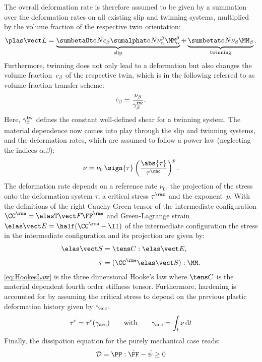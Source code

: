 The overall deformation rate is therefore assumed to be given by a summation over the deformation rates on all existing slip and twinning systems, multiplied by the volume fraction of the respective twin orientation\supercite{kalidindi1998incorporation}:  
\begin{equation}
  \LLp = \underbrace{\sumbO \cb \sumaI \nuab \MMab}_{\text{slip}} + \underbrace{\sumbI \nub \MMb}_{\text{twinning}}.
\end{equation}
Furthermore, twinning does not only lead to a deformation but also changes the volume fraction~$c_{\beta}$ of the respective twin, which is in the following referred to as volume fraction transfer scheme:
\begin{align}
  \dot{c}_{\beta} = \frac{\nu_\beta}{\gamma^{\rm tw}_\beta}.
\end{align}
Here, $\gamma^{\rm tw}_\beta$ defines the constant well-defined shear for a twinning system. The material dependence now comes into play through the slip and twinning systems, and the deformation rates, which are assumed to follow a power law (neglecting the indices $\alpha$,$\beta$):
\begin{align}
  \nu = \nu_0 \, \sign{\tau} \left( \frac{\abs{\tau}}{\tau^\rmc} \right)^{p}.
  \label{eq:powerlaw}
\end{align}
The deformation rate depends on a reference rate $\nu_0$, the projection of the stress onto the deformation system $\tau$, a critical stress $\tau^\rmc$ and the exponent~$p$. With the definitions of the right Cauchy-Green tensor of the intermediate configuration $\CCe=\FFeT\FFe$ and Green-Lagrange strain $\EEe=\half(\CCe-\II)$ of the intermediate configuration the stress in the intermediate configuration and its projection are given by:
\begin{align}
  \SSe &= \CCCC:\EEe,  \label{eq:HookesLaw} \\[3pt]
  \tau &= (\CCe\SSe):\MM.
\end{align}
\cref{eq:HookesLaw} is the three dimensional Hooke's law where $\CCCC$ is the material dependent fourth order stiffness tensor. Furthermore, hardening is accounted for by assuming the critical stress to depend on the previous plastic deformation history given by $\gamma_{\rm acc}$.
\begin{align}
  \tau^{\rm c} = \tau^{\rm c}(\gamma_{\rm acc}) \qquad \text{with} \qquad \gamma_{\rm acc} = \int_t \nu \, {\rm d} t
\end{align}
Finally, the dissipation equation for the purely mechanical case reads:
\begin{align} 
  \mathcal{D} = \PP:\dot\FF - \dot\psi \geq 0
\end{align}

